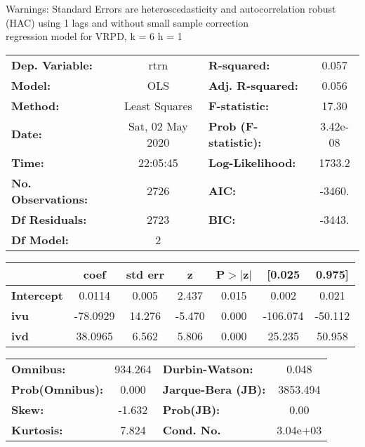 Warnings: \newline
 [1] Standard Errors are heteroscedasticity and autocorrelation robust (HAC) using 1 lags and without small sample correction\\ 

regression model for VRPD, k = 6 h = 1\begin{center}
\begin{tabular}{lclc}
\toprule
\textbf{Dep. Variable:}    &       rtrn       & \textbf{  R-squared:         } &     0.057   \\
\textbf{Model:}            &       OLS        & \textbf{  Adj. R-squared:    } &     0.056   \\
\textbf{Method:}           &  Least Squares   & \textbf{  F-statistic:       } &     17.30   \\
\textbf{Date:}             & Sat, 02 May 2020 & \textbf{  Prob (F-statistic):} &  3.42e-08   \\
\textbf{Time:}             &     22:05:45     & \textbf{  Log-Likelihood:    } &    1733.2   \\
\textbf{No. Observations:} &        2726      & \textbf{  AIC:               } &    -3460.   \\
\textbf{Df Residuals:}     &        2723      & \textbf{  BIC:               } &    -3443.   \\
\textbf{Df Model:}         &           2      & \textbf{                     } &             \\
\bottomrule
\end{tabular}
\begin{tabular}{lcccccc}
                   & \textbf{coef} & \textbf{std err} & \textbf{z} & \textbf{P$> |$z$|$} & \textbf{[0.025} & \textbf{0.975]}  \\
\midrule
\textbf{Intercept} &       0.0114  &        0.005     &     2.437  &         0.015        &        0.002    &        0.021     \\
\textbf{ivu}       &     -78.0929  &       14.276     &    -5.470  &         0.000        &     -106.074    &      -50.112     \\
\textbf{ivd}       &      38.0965  &        6.562     &     5.806  &         0.000        &       25.235    &       50.958     \\
\bottomrule
\end{tabular}
\begin{tabular}{lclc}
\textbf{Omnibus:}       & 934.264 & \textbf{  Durbin-Watson:     } &    0.048  \\
\textbf{Prob(Omnibus):} &   0.000 & \textbf{  Jarque-Bera (JB):  } & 3853.494  \\
\textbf{Skew:}          &  -1.632 & \textbf{  Prob(JB):          } &     0.00  \\
\textbf{Kurtosis:}      &   7.824 & \textbf{  Cond. No.          } & 3.04e+03  \\
\bottomrule
\end{tabular}
\end{center}

